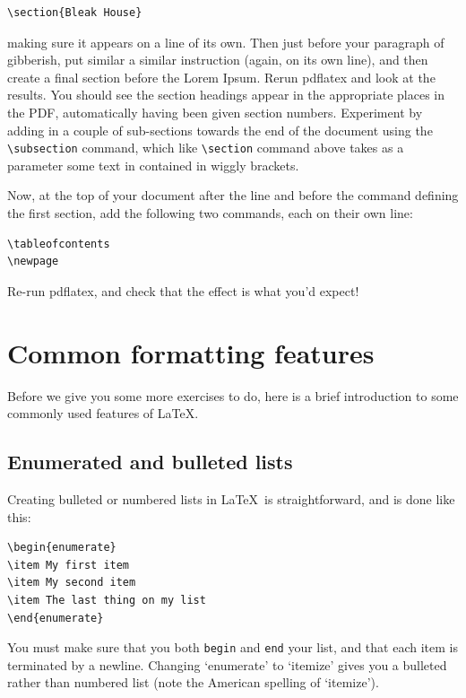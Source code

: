 \begin{verbatim}
\section{Bleak House}
\end{verbatim}
%
making sure it appears on a line of its own. Then just before your paragraph of gibberish, put similar a similar instruction (again, on its own line), and then create a final section before the Lorem Ipsum. Rerun pdflatex and look at the results. You should see the section headings appear in the appropriate places in the PDF, automatically having been given section numbers. Experiment by adding in a couple of sub-sections towards the end of the document using the  \verb|\subsection| command, which like \verb|\section| command above takes as a parameter some text in contained in wiggly brackets. 

Now, at the top of your document after the \verb|| line and before the command defining the first section, add the following two commands, each on their own line:

\begin{verbatim}
\tableofcontents
\newpage
\end{verbatim}
%
Re-run pdflatex, and check that the effect is what you'd expect!

\section{Common formatting features}

Before we give you some more exercises to do, here is a brief introduction to some commonly used features of \LaTeX.

\subsection{Enumerated and bulleted lists}

Creating bulleted or numbered lists in \LaTeX\ is straightforward, and is done like this:

\begin{verbatim}
\begin{enumerate}
\item My first item
\item My second item
\item The last thing on my list
\end{enumerate}
\end{verbatim}
%
You must make sure that you both \texttt{begin} and \texttt{end} your list, and that each item is terminated by a newline. Changing `enumerate' to `itemize' gives you a bulleted rather than numbered list (note the American spelling of `itemize').  

